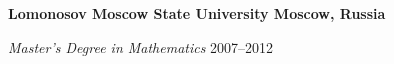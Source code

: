 \textbf{Lomonosov Moscow State University \hfill Moscow, Russia} \par
\textit{Master’s Degree in Mathematics}  \hfill 2007--2012\par

